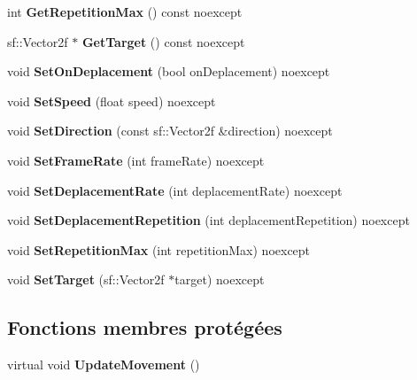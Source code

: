 \begin{DoxyCompactItemize}
int {\bfseries Get\+Repetition\+Max} () const noexcept
\item 
\mbox{\label{classmy_1_1MoovableObject_aa968bbaf7ab53cd586f1608c578bebf0}} 
sf\+::\+Vector2f $\ast$ {\bfseries Get\+Target} () const noexcept
\item 
\mbox{\label{classmy_1_1MoovableObject_ab16c059fa42967679b4f6a3608c0cc70}} 
void {\bfseries Set\+On\+Deplacement} (bool on\+Deplacement) noexcept
\item 
\mbox{\label{classmy_1_1MoovableObject_a88156d7514b00250efe0dacae22c1081}} 
void {\bfseries Set\+Speed} (float speed) noexcept
\item 
\mbox{\label{classmy_1_1MoovableObject_a715e0bc98cd76d55b349cc7b3576b2a2}} 
void {\bfseries Set\+Direction} (const sf\+::\+Vector2f \&direction) noexcept
\item 
\mbox{\label{classmy_1_1MoovableObject_ab321cbf7f36daf3cbcc7d64c8ffd76d6}} 
void {\bfseries Set\+Frame\+Rate} (int frame\+Rate) noexcept
\item 
\mbox{\label{classmy_1_1MoovableObject_aaded98ee5e816f3625f7c8131e39e379}} 
void {\bfseries Set\+Deplacement\+Rate} (int deplacement\+Rate) noexcept
\item 
\mbox{\label{classmy_1_1MoovableObject_a7b57191d3cdbe81551a5947af184ca40}} 
void {\bfseries Set\+Deplacement\+Repetition} (int deplacement\+Repetition) noexcept
\item 
\mbox{\label{classmy_1_1MoovableObject_a50f93ff5d9816b85275e2a65874ac7e9}} 
void {\bfseries Set\+Repetition\+Max} (int repetition\+Max) noexcept
\item 
\mbox{\label{classmy_1_1MoovableObject_a85beb58fdd3f22e3a110cc1ef15f58e2}} 
void {\bfseries Set\+Target} (sf\+::\+Vector2f $\ast$target) noexcept
\end{DoxyCompactItemize}
\subsection*{Fonctions membres protégées}
\begin{DoxyCompactItemize}
\item 
\mbox{\label{classmy_1_1MoovableObject_a805a7e19ec70558728f0467a9e05651a}} 
virtual void {\bfseries Update\+Movement} ()
\end{DoxyCompactItemize}
